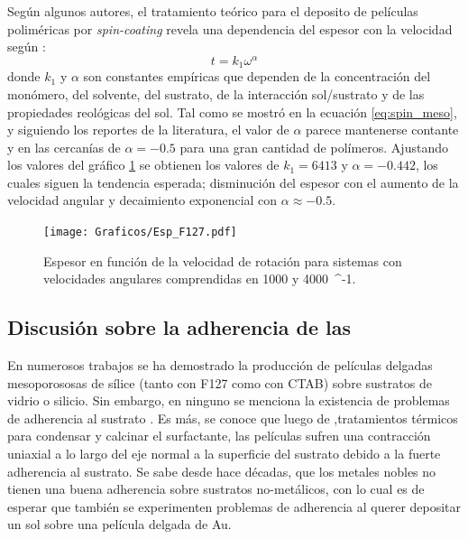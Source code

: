 		Según algunos autores, el tratamiento teórico para el deposito de películas poliméricas por \textit{spin-coating} revela una dependencia del espesor con la velocidad según \cite{Norrman2005,Meyerhofer1978,Bornside1989,Lora1990}:
			\begin{equation}
			  t = k_1 \omega^{\alpha}
			  \label{eq:spin_meso}
			  \end{equation}		
		donde $k_1$ y $\alpha$ son constantes empíricas que dependen de la concentración del monómero, del solvente, del sustrato, de la interacción sol/sustrato y  de las propiedades reológicas del sol. Tal como se mostró en la ecuación \ref{eq:spin_meso}, y siguiendo los reportes de la literatura, el valor de $\alpha$ parece mantenerse contante y en las cercanías de $\alpha=-0.5$ para una gran cantidad de polímeros. Ajustando los valores del gráfico \ref{fig:esp} se obtienen los valores de $k_1=6413$ y  $\alpha=-0.442$, los cuales siguen la tendencia esperada; disminución del espesor con el aumento de la velocidad angular y decaimiento exponencial con $\alpha \approx -0.5$. 
			\begin{figure}[!ht]
						\begin{center}
						\texttt{[image: Graficos/Esp\_F127.pdf]}
						\caption[Espesor en función de la velocidad de rotación.]{Espesor en función de la velocidad de rotación para sistemas \pdmF con velocidades angulares comprendidas en 1000 y \SI{4000}{\minute^{-1}.}}
						\label{fig:esp}
						\end{center}
						\end{figure}

	\subsection{Discusión sobre la adherencia de las \pdm}	

		 En numerosos trabajos se ha demostrado la producción de películas delgadas mesoporososas de sílice (tanto con F127 como con CTAB) sobre sustratos de vidrio o silicio. Sin embargo, en ninguno se menciona la existencia de problemas de adherencia al sustrato \cite{Angelome2008,Fuertes2010,Violi2015}. Es más, se conoce que luego de ,tratamientos térmicos para condensar y calcinar el surfactante, las películas sufren una contracción uniaxial a lo largo del eje normal a la superficie del sustrato debido a la fuerte adherencia al sustrato.\cite{Grosso2004,Soler-Illia2012,Chougnet2005} Se sabe desde hace décadas, que los metales nobles no tienen una buena adherencia sobre sustratos no-metálicos\cite{Kern1990,Hieber1976}, con lo cual es de esperar que también se experimenten problemas de adherencia al querer depositar un sol sobre una película delgada de Au. 


